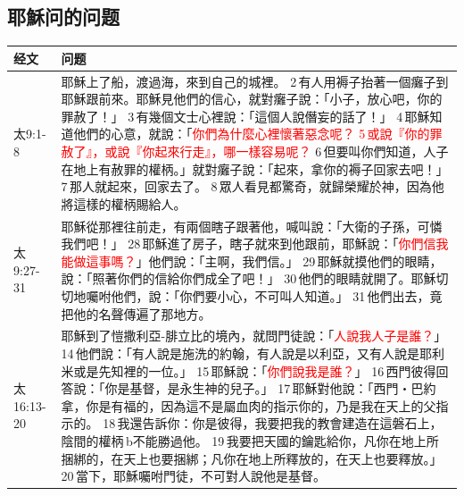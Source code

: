 \subsection{耶穌问的问题}
\begin{table}[H]
  \centering  
    \begin{tabular}{p{4.72em}|p{40.72em}} \toprule
 经文  &\textbf{问题} \\ \midrule
太9:1-8 &耶穌上了船，渡過海，來到自己的城裡。 2 有人用褥子抬著一個癱子到耶穌跟前來。耶穌見他們的信心，就對癱子說：「小子，放心吧，你的罪赦了！」 3 有幾個文士心裡說：「這個人說僭妄的話了！」 4 耶穌知道他們的心意，就說：「\textcolor{red}{你們為什麼心裡懷著惡念呢？ 5 或說『你的罪赦了』，或說『你起來行走』，哪一樣容易呢？} 6 但要叫你們知道，人子在地上有赦罪的權柄。」就對癱子說：「起來，拿你的褥子回家去吧！」 7 那人就起來，回家去了。 8 眾人看見都驚奇，就歸榮耀於神，因為他將這樣的權柄賜給人。   \\ \midrule 
太9:27-31&耶穌從那裡往前走，有兩個瞎子跟著他，喊叫說：「大衛的子孫，可憐我們吧！」 28 耶穌進了房子，瞎子就來到他跟前，耶穌說：「\textcolor{red}{你們信我能做這事嗎？}」他們說：「主啊，我們信。」 29 耶穌就摸他們的眼睛，說：「照著你們的信給你們成全了吧！」 30 他們的眼睛就開了。耶穌切切地囑咐他們，說：「你們要小心，不可叫人知道。」 31 他們出去，竟把他的名聲傳遍了那地方。\\\midrule

太16:13-20&耶穌到了愷撒利亞-腓立比的境內，就問門徒說：「\textcolor{red}{人說我人子是誰？}」 14 他們說：「有人說是施洗的約翰，有人說是以利亞，又有人說是耶利米或是先知裡的一位。」 15 耶穌說：「\textcolor{red}{你們說我是誰？}」 16 西門彼得回答說：「你是基督，是永生神的兒子。」 17 耶穌對他說：「西門‧巴約拿，你是有福的，因為這不是屬血肉的指示你的，乃是我在天上的父指示的。 18 我還告訴你：你是彼得，我要把我的教會建造在這磐石上，陰間的權柄 b不能勝過他。 19 我要把天國的鑰匙給你，凡你在地上所捆綁的，在天上也要捆綁；凡你在地上所釋放的，在天上也要釋放。」 20 當下，耶穌囑咐門徒，不可對人說他是基督。\\\midrule


    \bottomrule
    \end{tabular}%
  \label{tab:addlabel}%
\end{table}%

